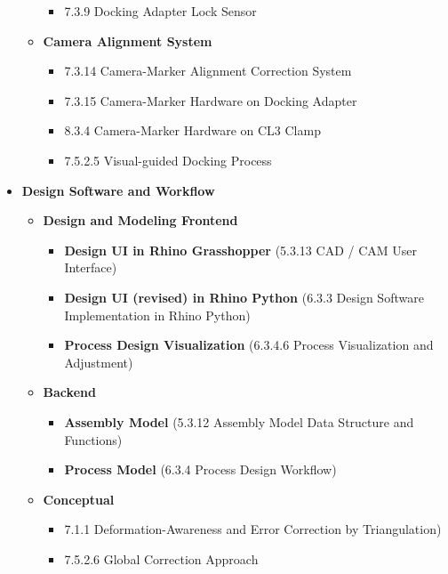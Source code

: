 \begin{itemize}
\begin{itemize}
\begin{itemize}
	\item 7.3.9 Docking Adapter Lock Sensor

\end{itemize}
	\item \textbf{Camera Alignment System}

\begin{itemize}
	\item 7.3.14 Camera-Marker Alignment Correction System

	\item 7.3.15 Camera-Marker Hardware on Docking Adapter

	\item 8.3.4 Camera-Marker Hardware on CL3 Clamp

	\item 7.5.2.5 Visual-guided Docking Process

\end{itemize}
\end{itemize}
	\item \textbf{Design Software and Workflow}

\begin{itemize}
	\item \textbf{Design and Modeling Frontend}

\begin{itemize}
	\item \textbf{Design UI in Rhino Grasshopper} (5.3.13 CAD / CAM User Interface)

	\item \textbf{Design UI (revised) in Rhino Python }(6.3.3 Design Software Implementation in Rhino Python)

	\item \textbf{Process Design Visualization} (6.3.4.6 Process Visualization and Adjustment)

\end{itemize}
	\item \textbf{Backend}

\begin{itemize}
	\item \textbf{Assembly Model} (5.3.12 Assembly Model Data Structure and Functions)

	\item \textbf{Process Model} (6.3.4 Process Design Workflow)

\end{itemize}
	\item \textbf{Conceptual}

\begin{itemize}
	\item 7.1.1 Deformation-Awareness and Error Correction by Triangulation)

	\item 7.5.2.6 Global Correction Approach

\end{itemize}
\end{itemize}
\end{itemize}

